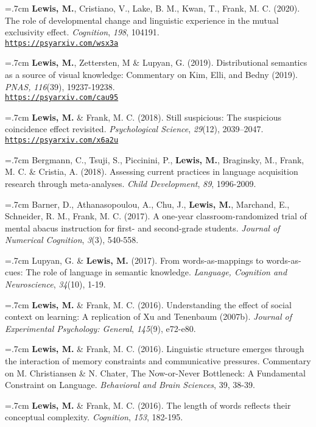 \documentclass[letterpaper]{article}
\begin{document}
\hangindent=.7cm {\bf Lewis, M.}, Cristiano, V., Lake, B. M., Kwan, T., Frank, M. C. (2020). The role of developmental change and linguistic experience in the mutual exclusivity effect. {\it Cognition}, {\it 198}, 104191. \\ \href{https://psyarxiv.com/wsx3a}{\tt https://psyarxiv.com/wsx3a}


\hangindent=.7cm {\bf Lewis, M.}, Zettersten, M \& Lupyan, G. (2019).  Distributional semantics as a source of visual knowledge: Commentary on Kim, Elli, and Bedny (2019).  {\it PNAS,} {\it 116}(39), 19237-19238. \\ \href{https://psyarxiv.com/cau95}{\tt https://psyarxiv.com/cau95}

\hangindent=.7cm {\bf Lewis, M.} \& Frank, M. C. (2018). Still suspicious: The suspicious coincidence effect revisited.  {\it Psychological Science}, {\it 29}(12), 2039--2047. \href{https://psyarxiv.com/x6a2u}{\tt https://psyarxiv.com/x6a2u}

\hangindent=.7cm Bergmann, C., Tsuji, S., Piccinini, P., {\bf Lewis, M.}, Braginsky, M., Frank, M. C. \& Cristia, A. (2018). Assessing current practices in language acquisition research through meta-analyses. {\it Child Development},  {\it 89}, 1996-2009.

\hangindent=.7cm Barner, D., Athanasopoulou, A., Chu, J., {\bf Lewis, M.}, Marchand, E., Schneider, R. M., Frank, M. C. (2017). A one-year classroom-randomized trial of mental abacus instruction for first- and second-grade students.  {\it Journal of Numerical Cognition}, {\it  3}(3), 540-558.

\hangindent=.7cm Lupyan, G. \& {\bf Lewis, M.} (2017). From words-as-mappings to words-as-cues: The role of language in semantic knowledge. {\it Language, Cognition and Neuroscience}, {\it 34}(10), 1-19.

  \hangindent=.7cm {\bf Lewis, M.} \& Frank, M. C. (2016). Understanding the effect of social context on learning: A replication of Xu and Tenenbaum (2007b). {\it Journal of Experimental Psychology: General}, {\it 145}(9), e72-e80.

 \hangindent=.7cm {\bf Lewis, M.} \& Frank, M. C. (2016). Linguistic structure emerges through the interaction of memory constraints and communicative pressures. Commentary on M. Christiansen \& N. Chater, The Now-or-Never Bottleneck: A Fundamental Constraint on Language. {\it Behavioral and Brain Sciences}, 39, 38-39.

  \hangindent=.7cm {\bf Lewis, M.} \& Frank, M. C. (2016). The length of words reflects their conceptual complexity. {\it Cognition}, {\it 153}, 182-195.
\end{document}
